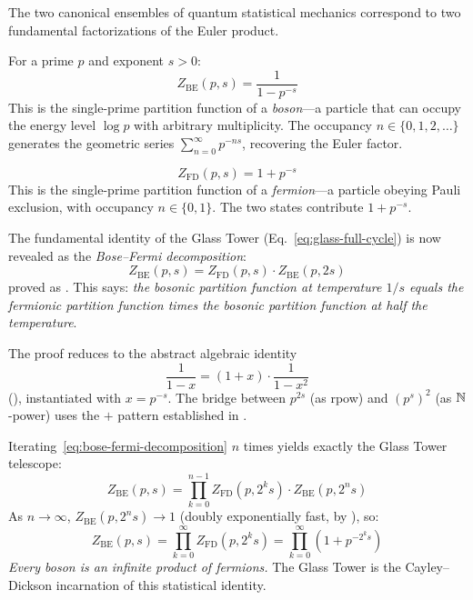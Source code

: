 The two canonical ensembles of quantum statistical mechanics correspond
to two fundamental factorizations of the Euler product.

\begin{definition}
For a prime $p$ and exponent $s > 0$:
\begin{equation}
  Z_{\mathrm{BE}}(p, s) = \frac{1}{1 - p^{-s}}
  \label{eq:bose-einstein}
\end{equation}
This is the single-prime partition function of a \emph{boson}---a
particle that can occupy the energy level $\log p$ with arbitrary
multiplicity. The occupancy $n \in \{0, 1, 2, \ldots\}$ generates
the geometric series $\sum_{n=0}^{\infty} p^{-ns}$, recovering the
Euler factor.
\end{definition}

\begin{definition}
\begin{equation}
  Z_{\mathrm{FD}}(p, s) = 1 + p^{-s}
  \label{eq:fermi-dirac}
\end{equation}
This is the single-prime partition function of a \emph{fermion}---a
particle obeying Pauli exclusion, with occupancy $n \in \{0, 1\}$.
The two states contribute $1 + p^{-s}$.
\end{definition}

\begin{correspondence}
\label{corr:bose-fermi}
The fundamental identity of the Glass Tower
(Eq.~\ref{eq:glass-full-cycle}) is now revealed as the
\emph{Bose--Fermi decomposition}:
\begin{equation}
  Z_{\mathrm{BE}}(p, s) = Z_{\mathrm{FD}}(p, s) \cdot Z_{\mathrm{BE}}(p, 2s)
  \label{eq:bose-fermi-decomposition}
\end{equation}
proved as . This says:
\emph{the bosonic partition function at temperature $1/s$ equals the
fermionic partition function times the bosonic partition function at
half the temperature}.

The proof reduces to the abstract algebraic identity
\[
  \frac{1}{1-x} = (1+x) \cdot \frac{1}{1-x^2}
\]
(), instantiated with $x = p^{-s}$.
The bridge between $p^{2s}$ (as rpow) and $(p^s)^2$ (as $\mathbb{N}$-power)
uses the  $+$  pattern established
in .
\end{correspondence}

Iterating~\eqref{eq:bose-fermi-decomposition} $n$ times yields exactly
the Glass Tower telescope:
\begin{equation}
  Z_{\mathrm{BE}}(p, s) = \prod_{k=0}^{n-1} Z_{\mathrm{FD}}(p, 2^k s)
  \cdot Z_{\mathrm{BE}}(p, 2^n s)
\end{equation}
As $n \to \infty$, $Z_{\mathrm{BE}}(p, 2^n s) \to 1$ (doubly
exponentially fast, by ), so:
\[
  Z_{\mathrm{BE}}(p, s)
  = \prod_{k=0}^{\infty} Z_{\mathrm{FD}}(p, 2^k s)
  = \prod_{k=0}^{\infty} (1 + p^{-2^k s})
\]
\emph{Every boson is an infinite product of fermions.} The Glass Tower
is the Cayley--Dickson incarnation of this statistical identity.

